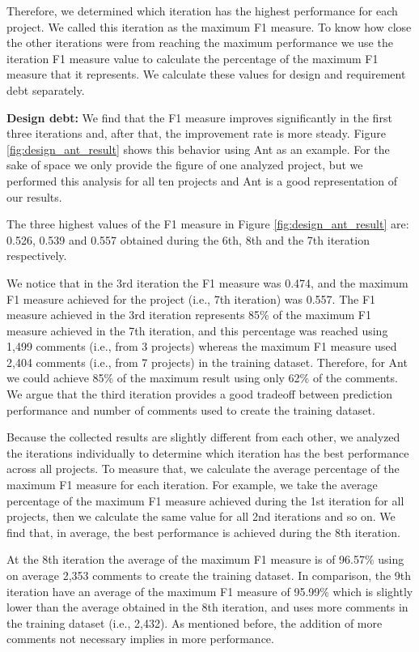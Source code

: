 Therefore, we determined which iteration has the highest performance for each project. We called this iteration as the maximum F1 measure. To know how close the other iterations were from reaching the maximum performance we use the iteration F1 measure value to calculate the percentage of the maximum F1 measure that it represents. We calculate these values for design and requirement debt separately.

\vspace{1mm}
\noindent \textbf{Design debt:} We find that the F1 measure improves significantly in the first three iterations and, after that, the improvement rate is more steady. Figure \ref{fig:design_ant_result} shows this behavior using Ant as an example. For the sake of space we only provide the figure of one analyzed project, but we performed this analysis for all ten projects and Ant is a good representation of our results. 

The three highest values of the F1 measure in Figure \ref{fig:design_ant_result} are: 0.526, 0.539 and 0.557 obtained during the 6th, 8th and the 7th iteration respectively.

We notice that in the 3rd iteration the F1 measure was 0.474, and the maximum F1 measure achieved for the project (i.e., 7th iteration) was 0.557. The F1 measure achieved in the 3rd iteration represents 85\% of the maximum F1 measure achieved in the 7th iteration, and this percentage was reached using 1,499 comments (i.e., from 3 projects) whereas the maximum F1 measure used 2,404 comments (i.e., from 7 projects) in the training dataset. Therefore, for Ant we could achieve 85\% of the maximum result using only 62\% of the comments. We argue that the third iteration provides a good tradeoff between prediction performance and number of comments used to create the training dataset.

Because the collected results are slightly different from each other, we analyzed the iterations individually to determine which iteration has the best performance across all projects. To measure that, we calculate the average percentage of the maximum F1 measure for each iteration. For example, we take the average percentage of the maximum F1 measure achieved during the 1st iteration for all projects, then we calculate the same value for all 2nd iterations and so on. We find that, in average, the best performance is achieved during the 8th iteration.

At the 8th iteration the average of the maximum F1 measure is of 96.57\% using on average 2,353 comments to create the training dataset. In comparison, the 9th iteration have an average of the maximum F1 measure of 95.99\% which is slightly lower than the average obtained in the 8th iteration, and uses more comments in the training dataset (i.e., 2,432). As mentioned before, the addition of more comments not necessary implies in more performance.

